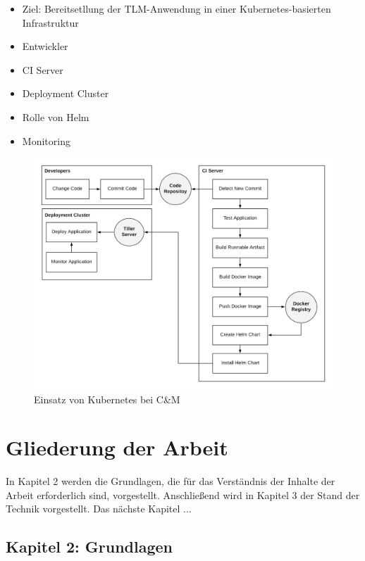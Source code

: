 \begin{itemize}
	\item Ziel: Bereitsetllung der TLM-Anwendung in einer Kubernetes-basierten Infrastruktur
	\item Entwickler
	\item CI Server
	\item Deployment Cluster
	\item Rolle von Helm
	\item Monitoring
\end{itemize}


\begin{figure}[h]
	\centering
	\includegraphics[width=\textwidth]{images/demonstrator.png}
	\caption{Einsatz von Kubernetes bei C\&M}
	\label{fig:demonstrator}
\end{figure}

\section{Gliederung der Arbeit}
\label{sec:gliederung}

In Kapitel 2 werden die Grundlagen, die für das Verständnis der Inhalte der Arbeit erforderlich sind, vorgestellt.
Anschließend wird in Kapitel 3 der Stand der Technik vorgestellt.
Das nächste Kapitel ...


\newpage
\subsection*{Kapitel 2: Grundlagen}

